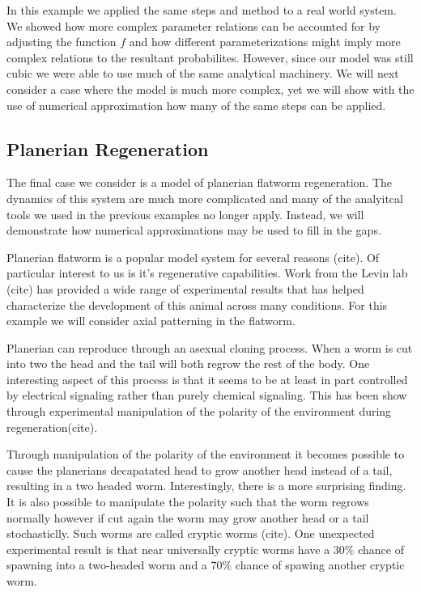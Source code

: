 \documentclass[letterpaper]{article}
\begin{document}
In this example we applied the same steps and method to a real world system. We showed how
more complex parameter relations can be accounted for by adjusting the function $f$ and how
different parameterizations might imply more complex relations to the resultant probabilites.
However, since our model was still cubic we were able to use much of the same analytical 
machinery. We will next consider a case where the model is much more complex, yet we will 
show with the use of numerical approximation how many of the same steps can be applied.

\subsection{Planerian Regeneration}

The final case we consider is a model of planerian flatworm regeneration. The dynamics 
of this system are much more complicated and many of the analyitcal tools we used
in the previous examples no longer apply. Instead, we will demonstrate how numerical
approximations may be used to fill in the gaps.

Planerian flatworm is a popular model system for several reasons (cite). Of particular
interest to us is it's regenerative capabilities. Work from the Levin lab (cite) has
provided a wide range of experimental results that has helped characterize the development
of this animal across many conditions. For this example we will consider axial patterning
in the flatworm.

Planerian can reproduce through an asexual cloning process. When a worm is cut into two
the head and the tail will both regrow the rest of the body. One interesting aspect of
this process is that it seems to be at least in part controlled by electrical signaling
rather than purely chemical signaling. This has been show through experimental manipulation
of the polarity of the environment during regeneration(cite).

Through manipulation of the polarity of the environment it becomes possible to cause
the planerians decapatated head to grow another head instead of a tail, resulting
in a two headed worm. Interestingly, there is a more surprising finding. It is also
possible to manipulate the polarity such that the worm regrows normally however if 
cut again the worm may grow another head or a tail stochasticlly. Such worms are 
called cryptic worms (cite). One unexpected experimental result is that near universally
cryptic worms have a $30\%$ chance of spawning into a two-headed worm and a $70\%$ chance 
of spawing another cryptic worm.
\end{document}
